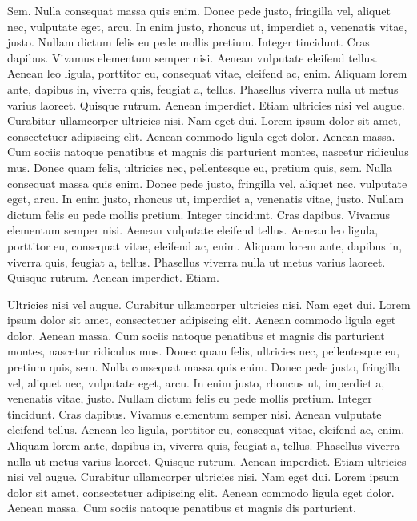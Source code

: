 \documentclass[
    12pt,
    letterpaper,
    oneside,
    noraggedright
]{turabian-researchpaper}
\begin{document}
Sem. Nulla consequat massa quis enim. Donec pede justo, fringilla vel,
aliquet nec, vulputate eget, arcu. In enim justo, rhoncus ut, imperdiet
a, venenatis vitae, justo. Nullam dictum felis eu pede mollis pretium.
Integer tincidunt. Cras dapibus. Vivamus elementum semper nisi. Aenean
vulputate eleifend tellus. Aenean leo ligula, porttitor eu, consequat
vitae, eleifend ac, enim. Aliquam lorem ante, dapibus in, viverra quis,
feugiat a, tellus. Phasellus viverra nulla ut metus varius laoreet.
Quisque rutrum. Aenean imperdiet. Etiam ultricies nisi vel augue.
Curabitur ullamcorper ultricies nisi. Nam eget dui. Lorem ipsum dolor
sit amet, consectetuer adipiscing elit. Aenean commodo ligula eget
dolor. Aenean massa. Cum sociis natoque penatibus et magnis dis
parturient montes, nascetur ridiculus mus. Donec quam felis, ultricies
nec, pellentesque eu, pretium quis, sem. Nulla consequat massa quis
enim. Donec pede justo, fringilla vel, aliquet nec, vulputate eget,
arcu. In enim justo, rhoncus ut, imperdiet a, venenatis vitae, justo.
Nullam dictum felis eu pede mollis pretium. Integer tincidunt. Cras
dapibus. Vivamus elementum semper nisi. Aenean vulputate eleifend
tellus. Aenean leo ligula, porttitor eu, consequat vitae, eleifend ac,
enim. Aliquam lorem ante, dapibus in, viverra quis, feugiat a, tellus.
Phasellus viverra nulla ut metus varius laoreet. Quisque rutrum. Aenean
imperdiet. Etiam.

Ultricies nisi vel augue. Curabitur ullamcorper ultricies nisi. Nam eget
dui. Lorem ipsum dolor sit amet, consectetuer adipiscing elit. Aenean
commodo ligula eget dolor. Aenean massa. Cum sociis natoque penatibus et
magnis dis parturient montes, nascetur ridiculus mus. Donec quam felis,
ultricies nec, pellentesque eu, pretium quis, sem. Nulla consequat massa
quis enim. Donec pede justo, fringilla vel, aliquet nec, vulputate eget,
arcu. In enim justo, rhoncus ut, imperdiet a, venenatis vitae, justo.
Nullam dictum felis eu pede mollis pretium. Integer tincidunt. Cras
dapibus. Vivamus elementum semper nisi. Aenean vulputate eleifend
tellus. Aenean leo ligula, porttitor eu, consequat vitae, eleifend ac,
enim. Aliquam lorem ante, dapibus in, viverra quis, feugiat a, tellus.
Phasellus viverra nulla ut metus varius laoreet. Quisque rutrum. Aenean
imperdiet. Etiam ultricies nisi vel augue. Curabitur ullamcorper
ultricies nisi. Nam eget dui. Lorem ipsum dolor sit amet, consectetuer
adipiscing elit. Aenean commodo ligula eget dolor. Aenean massa. Cum
sociis natoque penatibus et magnis dis parturient.
\end{document}

